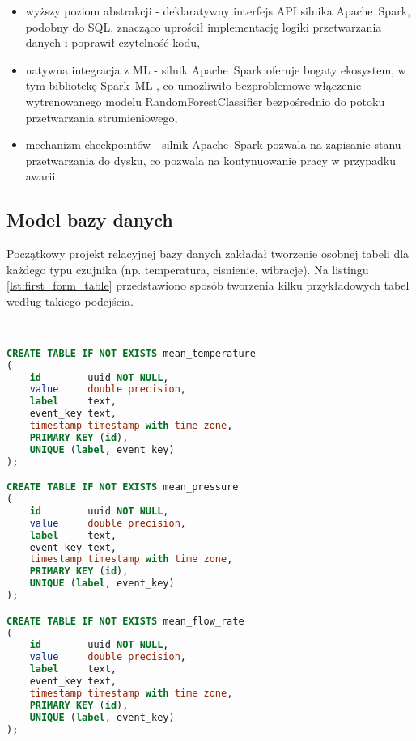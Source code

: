 \begin{itemize}
    \item wyższy poziom abstrakcji - deklaratywny interfejs API silnika \mbox{Apache Spark}, podobny do SQL, znacząco uprościł implementację logiki przetwarzania danych i poprawił czytelność kodu,
    \item natywna integracja z ML - silnik \mbox{Apache Spark} oferuje bogaty ekosystem, w tym bibliotekę \mbox{Spark ML} \cite{spark_streaming}, co umożliwiło bezproblemowe włączenie wytrenowanego modelu RandomForestClassifier bezpośrednio do potoku przetwarzania strumieniowego,
    \item mechanizm checkpointów - silnik \mbox{Apache Spark} pozwala na zapisanie stanu przetwarzania do dysku, co pozwala na kontynuowanie pracy w przypadku awarii.
\end{itemize}

\subsection{Model bazy danych}

Początkowy projekt relacyjnej bazy danych zakładał tworzenie osobnej tabeli dla każdego typu czujnika (np. temperatura, cisnienie, wibracje). Na listingu \ref{lst:first_form_table} przedstawiono sposób tworzenia kilku przykładowych tabel według takiego podejścia.

\begin{lstlisting}[caption=Pierwsza forma tabeli w relacyjnej bazie danych, label={lst:first_form_table},language=SQL]


CREATE TABLE IF NOT EXISTS mean_temperature
(
    id        uuid NOT NULL,
    value     double precision,
    label     text,
    event_key text,
    timestamp timestamp with time zone,
    PRIMARY KEY (id),
    UNIQUE (label, event_key)
);

CREATE TABLE IF NOT EXISTS mean_pressure
(
    id        uuid NOT NULL,
    value     double precision,
    label     text,
    event_key text,
    timestamp timestamp with time zone,
    PRIMARY KEY (id),
    UNIQUE (label, event_key)
);

CREATE TABLE IF NOT EXISTS mean_flow_rate
(
    id        uuid NOT NULL,
    value     double precision,
    label     text,
    event_key text,
    timestamp timestamp with time zone,
    PRIMARY KEY (id),
    UNIQUE (label, event_key)
);

\end{lstlisting}

\vspace{0.3em}

